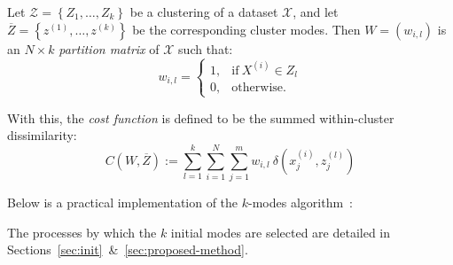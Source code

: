%

\begin{definition}\label{def:cost}
    Let \(\mathcal{Z} = \left\{Z_1, \ldots, Z_k\right\}\) be a clustering of a
    dataset \(\mathcal{X}\), and let \(\overline Z = \left\{z^{(1)},
    \ldots, z^{(k)}\right\}\) be the corresponding cluster modes. Then \(W =
    \left(w_{i, l}\right)\) is an \(N \times k\) \emph{partition matrix} of
    \(\mathcal{X}\) such that:
    \[
        w_{i, l} = \begin{cases}
                     1, & \text{if} \ X^{(i)} \in Z_l\\
                     0, & \text{otherwise.}
                   \end{cases}
    \]

    With this, the \emph{cost function} is defined to be the summed
    within-cluster dissimilarity:
    \begin{equation}
        C\left(W, \overline Z\right) := \sum_{l=1}^{k} \sum_{i=1}^{N}
        \sum_{j=1}^{m} w_{i,l} \ \delta\left(x_j^{(i)}, z_j^{(l)}\right)
    \end{equation}
\end{definition}

Below is a practical implementation of the \(k\)-modes
algorithm~\cite{Huang1998}:



\begin{remark}
    The processes by which the \(k\) initial modes are selected are detailed in 
    Sections~\ref{sec:init}~\&~\ref{sec:proposed-method}.
\end{remark}
